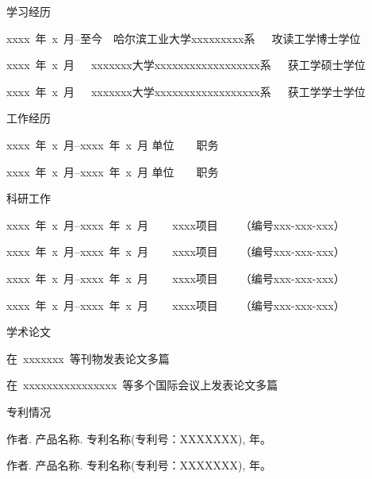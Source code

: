

{\hei 学习经历}
\begin{publist}
\item xxxx~年~x~月--至今~~哈尔滨工业大学xxxxxxxxx系~~~攻读工学博士学位
\item xxxx~年~x~月~~~xxxxxxx大学xxxxxxxxxxxxxxxxxx系~~~获工学硕士学位
\item xxxx~年~x~月~~~xxxxxxx大学xxxxxxxxxxxxxxxxxx系~~~获工学学士学位
\end{publist}

{\hei 工作经历}
\begin{publist}
\item xxxx~年~x~月--xxxx~年~x~月  单位　　职务
\item xxxx~年~x~月--xxxx~年~x~月  单位　　职务
\end{publist}

{\hei 科研工作}
\begin{publist}
\item  xxxx~年~x~月--xxxx~年~x~月 ~~~ xxxx项目~~~~（编号xxx-xxx-xxx）　
\item  xxxx~年~x~月--xxxx~年~x~月 ~~~ xxxx项目~~~~（编号xxx-xxx-xxx）
\item  xxxx~年~x~月--xxxx~年~x~月 ~~~ xxxx项目~~~~（编号xxx-xxx-xxx）
\item  xxxx~年~x~月--xxxx~年~x~月 ~~~ xxxx项目~~~~（编号xxx-xxx-xxx）
\end{publist}

{\hei 学术论文}
\begin{publist}
\item 在~xxxxxxx~等刊物发表论文多篇
\item 在~xxxxxxxxxxxxxxxx~等多个国际会议上发表论文多篇
\end{publist}

{\hei 专利情况}
\begin{publist}
\item 作者. 产品名称. 专利名称(专利号：XXXXXXX), 年。
\item 作者. 产品名称. 专利名称(专利号：XXXXXXX), 年。
\end{publist}
